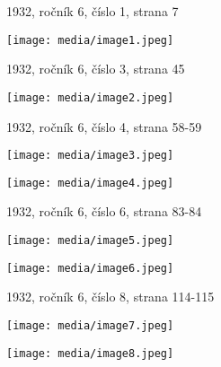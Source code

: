 1932, ročník 6, číslo 1, strana 7

\texttt{[image: media/image1.jpeg]}

1932, ročník 6, číslo 3, strana 45

\texttt{[image: media/image2.jpeg]}

1932, ročník 6, číslo 4, strana 58-59

\texttt{[image: media/image3.jpeg]}

\texttt{[image: media/image4.jpeg]}

1932, ročník 6, číslo 6, strana 83-84

\texttt{[image: media/image5.jpeg]}

\texttt{[image: media/image6.jpeg]}

1932, ročník 6, číslo 8, strana 114-115

\texttt{[image: media/image7.jpeg]}

\texttt{[image: media/image8.jpeg]}
